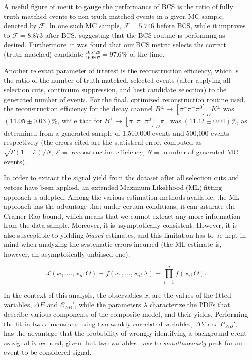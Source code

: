 \documentclass[aps,prl,twocolumn,superscriptaddress,showpacs,preprintnumbers,amsmath,amssymb]{revtex4}
\begin{document}
A useful figure of metit to gauge the performance of BCS is the ratio of fully truth-matched events to non-truth-matched events in a given MC sample, denoted by $\mathcal{F}$. In one such MC sample,
 $\mathcal{F} = 5.746 $ before BCS, while it improves to $\mathcal{F} = 8.873$ after BCS, suggesting that the BCS routine is performing as desired. Furthermore, it was found that our BCS metric selects the correct (truth-matched) candidate $\frac{165728}{169807} = 97.6 \%$ of the time. 

Another relevant parameter of interest is the reconstruction efficiency, which is the ratio of the number of truth-matched, selected events (after applying all selection cuts, continuum suppression, and best candidate selection) to the generated number of events. For the final, optimized reconstruction routine used, the reconstruction efficiency for the decay channel $B^{\pm} \rightarrow [\pi^+ \pi^- \pi^0]_{D} K^{\pm}$ was $(11.05 \pm 0.03) \%$, while that for $B^{\pm} \rightarrow [\pi^+ \pi^- \pi^0]_{D} \pi^{\pm}$ was $(11.12 \pm 0.04) \%$, as determined from a generated sample of 1,500,000 events and 500,000 events respectively (the errors cited are the statistical error, computed as $\sqrt{\mathcal{E}(1-\mathcal{E})/N}$, $\mathcal{E} =$ reconstruction efficiency, $N =$ number of generated MC events).

In order to extract the signal yield from the dataset after all selection cuts and vetoes have been applied, an extended Maximum Likelihood (ML) fitting approach is adopted. Among the various estimation methods available, the ML approach has the advantage that under certain conditions, it can saturate the Cramer-Rao bound, which means that we cannot extract any more information from the data sample. Moreover, it is asymptotically consistent. However, it is also susceptible to yielding \textit{biased} estimates, and this limitation has to be kept in mind when analyzing the systematic errors incurred (the ML estimate is, however, an asymptotically unbiased one). 

\begin{equation}
\label{eq:4}
\mathcal{L}(x_1, \ldots, x_n;\Theta) = f(x_1, \ldots, x_n;\lambda) = \prod\limits_{i=1}^{n}f(x_i;\Theta).
\end{equation}

In the context of this analysis, the observables $x_i$ are the values of the fitted variables, $\Delta E$ and $\mathcal{C}_{NB}'$, while the parameters $\lambda$ characterize the PDFs that describe various components of the composite model, and their yields. Performing the fit in two dimensions using two weakly correlated variables, $\Delta E$ and $\mathcal{C}_{NB}'$, has the advantage that the probability of wrongly identifying a background event as signal is reduced, given that two variables have to \textit{simultaneously} peak for an event to be considered signal.
\end{document}

